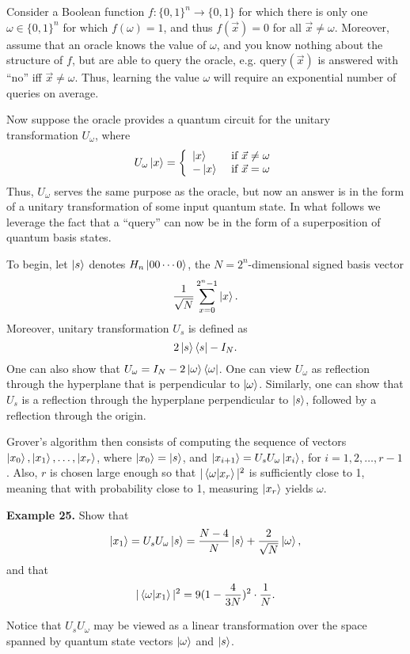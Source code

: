 \documentclass [12pt]{article}
\theoremstyle{definition}
\begin{document}
Consider a Boolean function $f:\{0,1\}^{n}\rightarrow \{0,1\}$ for which there is only one $\omega\in\{0,1\}^n$ for which $f(\omega)=1$, and thus $f(\vec{x})=0$ for all 
$\vec{x}\not=\omega$. Moreover, assume that an oracle knows the value of $\omega$, and you know nothing about the structure of $f$, but are able to query the oracle, e.g.
$\mbox{query}(\vec{x})$ is answered with ``no'' iff $\vec{x}\not=\omega$. Thus, learning the value $\omega$ will require an exponential number of queries on average.

Now suppose the oracle provides a quantum circuit for the unitary transformation $U_{\omega}$, where
\[U_{\omega}\ket{x} =\left\{\begin{array}{ll} 
\ket{x} & \mbox{ if } \vec{x}\not=\omega \\
-\ket{x} & \mbox{ if }\vec{x}=\omega \\
\end{array}\right.
\]
Thus, $U_{\omega}$ serves the same purpose as the oracle, but now an answer is in the form of a unitary transformation of some input quantum state. In what follows we leverage
the fact that a ``query'' can now be in the form of a superposition of quantum basis states.

To begin, let $\ket{s}$ denotes $H_n\ket{00\cdots 0}$, the $N=2^n$-dimensional signed basis vector 
\[\frac{1}{\sqrt{N}}\sum_{x=0}^{2^n-1}\ket{x}.\]
Moreover, unitary transformation $U_s$ is defined as
\[2\ket{s}\bra{s} - I_N.\]
One can also show that $U_{\omega} = I_N-2\ket{\omega}\bra{\omega}$. One can view $U_{\omega}$ as  reflection through the hyperplane that is perpendicular to $\ket{\omega}$. 
Similarly, one can show that $U_s$ is a reflection through the hyperplane perpendicular to $\ket{s}$, followed by a reflection through the origin.

Grover's algorithm then consists of computing the sequence of vectors $\ket{x_0},\ket{x_1},\ldots,\ket{x_r}$, where $\ket{x_0} = \ket{s}$, and $\ket{x_{i+1}}=U_sU_{\omega}\ket{x_i}$,
for $i=1,2,\ldots,r-1$. Also, $r$ is chosen large enough so that $|\braket{\omega|x_r}|^2$ is sufficiently close to 1, meaning that with probability close to 1, measuring
$\ket{x_r}$ yields $\omega$.

\newpage
\textbf{Example 25.} Show that 
\[\ket{x_1} = U_sU_{\omega}\ket{s} = \frac{N-4}{N}\ket{s} + \frac{2}{\sqrt{N}}\ket{\omega},\] and that 
\[|\braket{\omega|x_1}|^2 = 9(1-\frac{4}{3N})^2\cdot \frac{1}{N}.\]




\newpage
Notice that $U_sU_{\omega}$ may be viewed as a linear transformation over the space spanned by quantum state vectors $\ket{\omega}$ and $\ket{s}$. 
\end{document}
